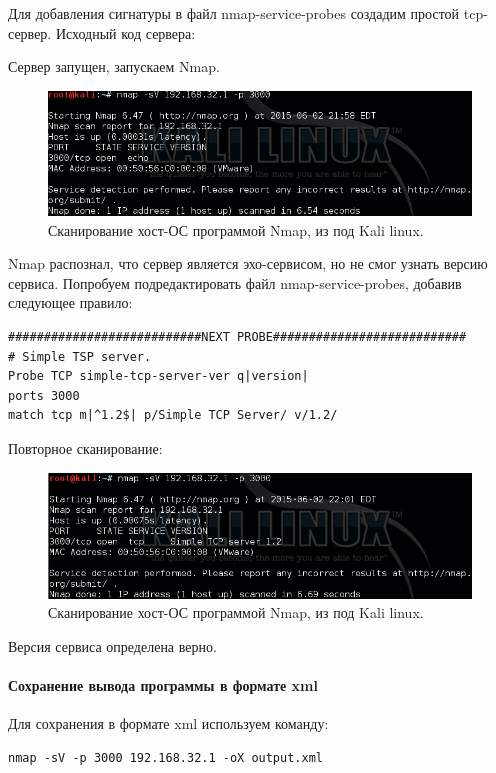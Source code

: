 \documentclass[a4paper, 14pt]{article}				%
\begin{document}
Для добавления сигнатуры в файл nmap-service-probes создадим простой tcp-сервер. Исходный код сервера:


Сервер запущен, запускаем Nmap.
\begin{figure}[h!]
\centering
\includegraphics[width=\textwidth]{rsrc/nmap_3}
\caption{Сканирование хост-ОС программой Nmap, из под Kali linux.}
\end{figure}

Nmap распознал, что сервер является эхо-сервисом, но не смог узнать версию сервиса. Попробуем подредактировать файл nmap-service-probes, добавив следующее правило:
\begin{Verbatim}[frame=single]
###########################NEXT PROBE###########################
# Simple TSP server.
Probe TCP simple-tcp-server-ver q|version|
ports 3000
match tcp m|^1.2$| p/Simple TCP Server/ v/1.2/
\end{Verbatim}

Повторное сканирование:

\begin{figure}[h!]
\centering
\includegraphics[width=\textwidth]{rsrc/nmap_tcpok}
\caption{Сканирование хост-ОС программой Nmap, из под Kali linux.}
\end{figure}
Версия сервиса определена верно.

\paragraph{Сохранение вывода программы в формате xml\\}
Для сохранения в формате xml используем команду:
\begin{Verbatim}[frame=single]
nmap -sV -p 3000 192.168.32.1 -oX output.xml
\end{Verbatim}
\end{document}
